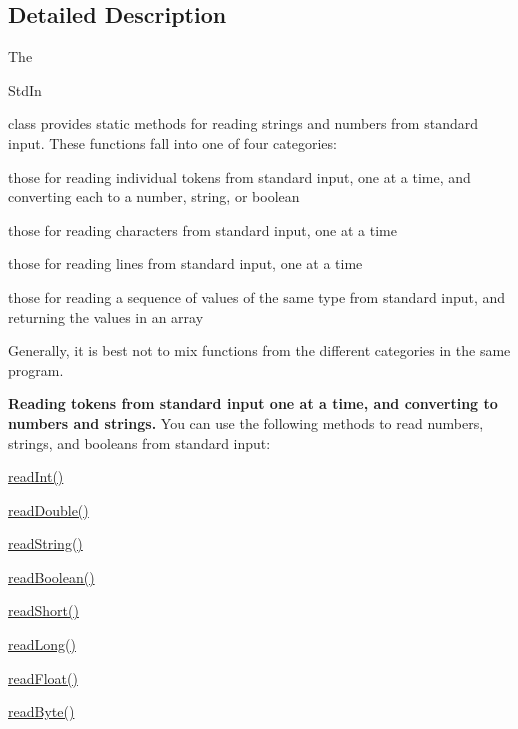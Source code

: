 \subsection{Detailed Description}
The
\begin{DoxyCode}
StdIn 
\end{DoxyCode}
 class provides static methods for reading strings and numbers from standard input. These functions fall into one of four categories\+: 
\begin{DoxyItemize}
\item those for reading individual tokens from standard input, one at a time, and converting each to a number, string, or boolean 
\item those for reading characters from standard input, one at a time 
\item those for reading lines from standard input, one at a time 
\item those for reading a sequence of values of the same type from standard input, and returning the values in an array 
\end{DoxyItemize}

Generally, it is best not to mix functions from the different categories in the same program. 

{\bfseries Reading tokens from standard input one at a time, and converting to numbers and strings.} You can use the following methods to read numbers, strings, and booleans from standard input\+: 
\begin{DoxyItemize}
\item \hyperlink{classcom_1_1mycompany_1_1myfirstmapboxapp_1_1_std_in_a5eafdf9c8e8d7e60b99642cb335c9175}{read\+Int()} 
\item \hyperlink{classcom_1_1mycompany_1_1myfirstmapboxapp_1_1_std_in_a4eeca1a8d8f9ab168bbe9ddf87d9f3e5}{read\+Double()} 
\item \hyperlink{classcom_1_1mycompany_1_1myfirstmapboxapp_1_1_std_in_aa787874d0065ebeb864a06b137a0250e}{read\+String()} 
\item \hyperlink{classcom_1_1mycompany_1_1myfirstmapboxapp_1_1_std_in_a5a31cc7a45f67f39235ed51fe340b847}{read\+Boolean()} 
\item \hyperlink{classcom_1_1mycompany_1_1myfirstmapboxapp_1_1_std_in_aeb2d54881b5dedc247ef806a979b1f16}{read\+Short()} 
\item \hyperlink{classcom_1_1mycompany_1_1myfirstmapboxapp_1_1_std_in_a0d4385fe7654b65b28f79deb65bb973a}{read\+Long()} 
\item \hyperlink{classcom_1_1mycompany_1_1myfirstmapboxapp_1_1_std_in_abbbb99b032bdedf7eaaef4282b8a33ab}{read\+Float()} 
\item \hyperlink{classcom_1_1mycompany_1_1myfirstmapboxapp_1_1_std_in_a1b98437306082b452b93f976072bb213}{read\+Byte()} 
\end{DoxyItemize}

